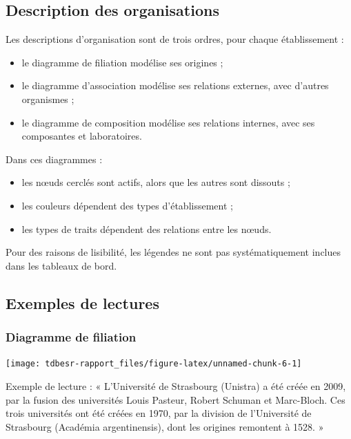 \documentclass[11pt,french,landscape]{article}
\providecommand{\tightlist}{%
  \setlength{\itemsep}{0pt}\setlength{\parskip}{0pt}}
\begin{document}
\begin{multicols}{2}
{\section{Description des
organisations}\label{description-des-organisations}}

Les descriptions d'organisation sont de trois ordres, pour chaque
établissement :

\begin{itemize}
\tightlist
\item
  le diagramme de filiation modélise ses origines ;
\item
  le diagramme d'association modélise ses relations externes, avec
  d'autres organismes ;
\item
  le diagramme de composition modélise ses relations internes, avec ses
  composantes et laboratoires.
\end{itemize}

Dans ces diagrammes :

\begin{itemize}
\tightlist
\item
  les nœuds cerclés sont actifs, alors que les autres sont dissouts ;
\item
  les couleurs dépendent des types d'établissement ;
\item
  les types de traits dépendent des relations entre les nœuds.
\end{itemize}

Pour des raisons de lisibilité, les légendes ne sont pas
systématiquement inclues dans les tableaux de bord.

\hypertarget{exemples-de-lectures}{%
\subsection{Exemples de lectures}\label{exemples-de-lectures}}

\hypertarget{diagramme-de-filiation}{%
\subsubsection{Diagramme de filiation}\label{diagramme-de-filiation}}

\begin{center}\texttt{[image: tdbesr-rapport\_files/figure-latex/unnamed-chunk-6-1]} \end{center}

Exemple de lecture : « L'Université de Strasbourg (Unistra) a été créée
en 2009, par la fusion des universités Louis Pasteur, Robert Schuman et
Marc-Bloch. Ces trois universités ont été créées en 1970, par la
division de l'Université de Strasbourg (Académia argentinensis), dont
les origines remontent à 1528. »


\end{multicols}
\end{document}
